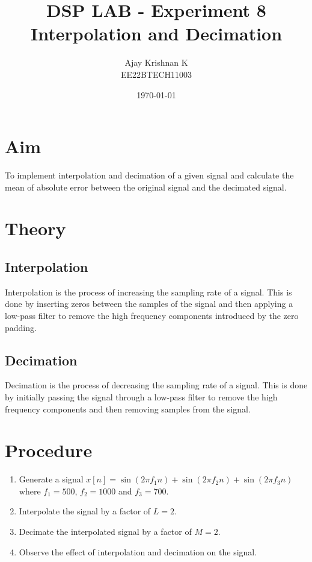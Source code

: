 \documentclass[a4paper,12pt]{article}
\title{\textbf{DSP LAB - Experiment 8} \\
        \vspace*{0.3em}
        \large{Interpolation and Decimation} \\}
\author{Ajay Krishnan K \\  EE22BTECH11003}
\date{\today}
\begin{document}
\maketitle


\section*{Aim}
To implement interpolation and decimation of a given signal and 
calculate the mean of absolute error between the original signal and the decimated signal.

\section*{Theory}
\subsection*{Interpolation}
Interpolation is the process of increasing the sampling rate of a signal. 
This is done by inserting zeros between the samples of the signal and then applying a 
low-pass filter to remove the high frequency components introduced by the zero padding.

\subsection*{Decimation}
Decimation is the process of decreasing the sampling rate of a signal.
This is done by initially passing the signal through a low-pass filter to 
remove the high frequency components and then removing samples from the signal.

\section*{Procedure}
\begin{enumerate}
    \item Generate a signal $x[n] = \sin(2\pi f_1 n) + \sin(2\pi f_2 n) + \sin(2\pi f_3 n)$ where $f_1 = 500$, $f_2 = 1000$ and $f_3 = 700$.
    \item Interpolate the signal by a factor of $L = 2$.
    \item Decimate the interpolated signal by a factor of $M = 2$.
    \item Observe the effect of interpolation and decimation on the signal.
\end{enumerate}
\end{document}
